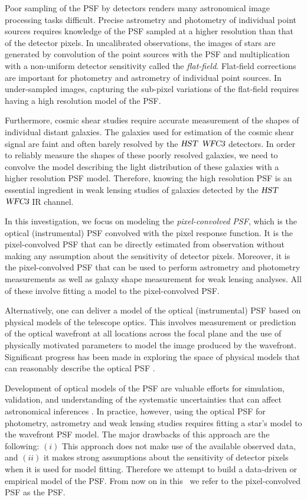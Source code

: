 Poor sampling of the PSF by detectors renders many astronomical image processing tasks difficult. Precise astrometry and photometry 
of individual point sources requires knowledge of the PSF sampled at a higher resolution than that of the detector pixels. 
In uncalibrated observations, the images of stars are generated by convolution of the point sources with the PSF and multiplication 
with a non-uniform detector sensitivity called the \emph{flat-field}. Flat-field corrections are important for photometry and astrometry of 
individual point sources. In under-sampled images, capturing the sub-pixel variations of the flat-field requires having a high resolution 
model of the PSF. 

Furthermore, cosmic shear studies require accurate measurement of the shapes of individual distant galaxies. The galaxies used for estimation 
of the cosmic shear signal are faint and often barely resolved by the ${\textsl{HST}}$ ${\textsl{WFC3}}$ detectors. In order to reliably measure the shapes of these poorly 
resolved galaxies, we need to convolve the model describing the light distribution of these galaxies with a higher resolution PSF model. 
Therefore, knowing the high resolution PSF is an essential ingredient in weak lensing studies of galaxies detected by the ${\textsl{HST}}$ ${\textsl{WFC3}}$ IR 
channel.   

In this investigation, we focus on modeling the \emph{pixel-convolved PSF}, which is the optical (instrumental) PSF convolved with the 
pixel response function. It is the pixel-convolved PSF that can be directly estimated from observation without making any assumption 
about the sensitivity of detector pixels. Moreover, it is the pixel-convolved PSF that can be used to perform astrometry and photometry measurements as well as 
galaxy shape measurement for weak lensing analyses. All of these involve fitting a model to the pixel-convolved PSF. 

Alternatively, one can deliver a model of the optical (instrumental) PSF based on physical models of the telescope optics. 
This involves measurement or prediction of the optical wavefront at all locations across the focal plane and the use of physically motivated parameters 
to model the image produced by the wavefront. Significant progress has been made in exploring the space of physical models that can reasonably 
describe the optical PSF \citep{zernike,krist1995,krist2011,galsim_software}. 

Development of optical models of the PSF are valuable efforts for simulation, validation, and understanding of the systematic uncertainties 
that can affect astronomical inferences \citep{great3,galsim}. In practice, however, using the optical PSF for photometry, astrometry and weak lensing studies 
requires fitting a star's model to the wavefront PSF model. The major drawbacks of this approach are the following: $(i)$ This approach does not make use of the available observed 
data, and $(ii)$ it makes strong assumptions about the sensitivity of detector pixels when it is used for model fitting. Therefore we attempt to build a 
data-driven or empirical model of the PSF. From now on in this \paper\, we refer to the pixel-convolved PSF as the PSF. 

